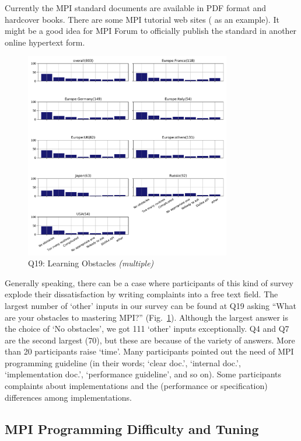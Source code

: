 \documentclass[conference,10pt,letterpaper]{IEEEtran}
\def\myquote#1{`#1'}
\begin{document}
Currently the MPI standard documents are available in PDF format and
hardcover books\cite{mpi-hardcover}. There are some MPI tutorial web
sites (\cite{mpi-tutorial} as an example). It might be a good idea for
MPI Forum to officially publish the standard in another
online hypertext form.

\begin{figure}[htb]
\begin{center}
\includegraphics[width=9cm]{Figs/Q19.pdf}
\caption{Q19: Learning Obstacles {\it(multiple)}}
\label{fig:learning-obstacles}
\end{center}
\end{figure}

Generally speaking, there can be a case where participants of this
kind of survey explode their dissatisfaction by writing complaints
into a free text field. The largest number of \myquote{other} inputs
in our survey can be found 
at Q19 asking ``What are your obstacles to mastering MPI?''
(Fig.~\ref{fig:learning-obstacles}). Although the largest answer is
the choice of \myquote{No obstacles}, we got 111 \myquote{other} inputs
exceptionally. Q4 and Q7 are the second largest (70), but these are
because of the variety of answers. 
More than 20 participants raise \myquote{time}. Many participants pointed
out the need of MPI programming guideline (in their words;
\myquote{clear doc.}, \myquote{internal doc.}, \myquote{implementation
  doc.}, \myquote{performance guideline}, and so on).
Some participants complaints about implementations and the
(performance or specification) differences among implementations.  

\subsection{MPI Programming Difficulty and Tuning}
\end{document}
